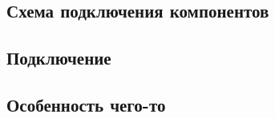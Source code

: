 \newpage
		\begin{center}	
				\section{Схема подключения компонентов}
		\end{center}
	\subsection{Подключение}

\subsection{Особенность чего-то}
